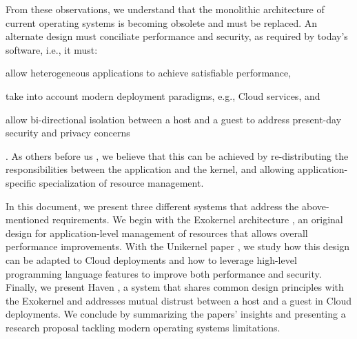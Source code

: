 From these observations, we understand that the monolithic architecture of current operating systems is becoming obsolete and must be replaced.
An alternate design must conciliate performance and security, as required by today's software, i.e., it must:
\begin{enumerate*}
	\item allow heterogeneous applications to achieve satisfiable performance,
	\item take into account modern deployment paradigms, e.g., Cloud services, and 
	\item allow bi-directional isolation between a host and a guest to address present-day security and privacy concerns
\end{enumerate*}.
As others before us \cite{DBLP:conf/sosp/EnglerKO95,DBLP:conf/hotos/EnglerK95,DBLP:conf/sosp/KaashoekEGBHMPGM97,DBLP:journals/tocs/CaoFKL96,DBLP:journals/sigops/HartyC92}, we believe that this can be achieved by re-distributing the responsibilities between the application and the kernel, and allowing application-specific specialization of resource management.

In this document, we present three different systems that address the above-mentioned requirements.
We begin with the Exokernel architecture \cite{DBLP:conf/sosp/EnglerKO95}, an original design for application-level management of resources that allows overall performance improvements.
With the Unikernel paper \cite{DBLP:conf/asplos/MadhavapeddyMRSSGSHC13}, we study how this design can be adapted to Cloud deployments and how to leverage high-level programming language features to improve both performance and security.
Finally, we present Haven \cite{DBLP:journals/tocs/BaumannPH15}, a system that shares common design principles with the Exokernel and addresses mutual distrust between a host and a guest in Cloud deployments.
We conclude by summarizing the papers' insights and presenting a research proposal tackling modern operating systems limitations.







